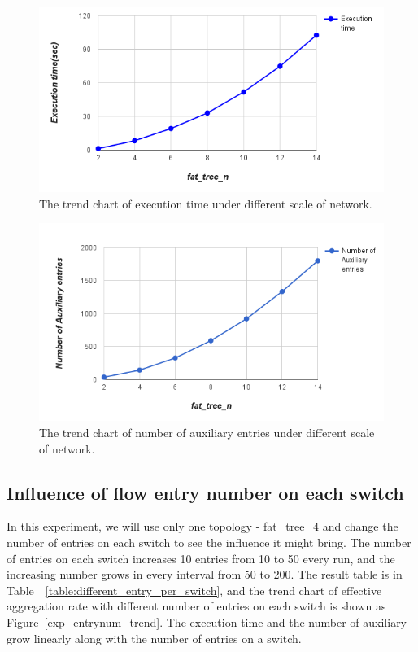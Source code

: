 \begin{figure}[H]
\begin{center} 
\includegraphics[width=1\textwidth]{figures/exp_scale_time_trend.png}
\end{center}
\caption{The trend chart of execution time under different scale of network.}
\label{different_scale_time_trend}
\end{figure}

\begin{figure}[H]
\begin{center} 
\includegraphics[width=1\textwidth]{figures/exp_scale_aux_trend.png}
\end{center}
\caption{The trend chart of number of auxiliary entries under different scale of network.}
\label{different_scale_aux_trend}
\end{figure}

\subsection{Influence of flow entry number on each switch}
In this experiment, we will use only one topology - fat\_tree\_4 and change the number of entries on each switch to see the influence it might bring. The number of entries on each switch increases 10 entries from 10 to 50 every run, and the increasing number grows in every interval from 50 to 200. The result table is in Table~~\ref{table:different_entry_per_switch}, and the trend chart of effective aggregation rate with different number of entries on each switch is shown as Figure~\ref{exp_entrynum_trend}. The execution time and the number of auxiliary grow linearly along with the number of entries on a switch.


